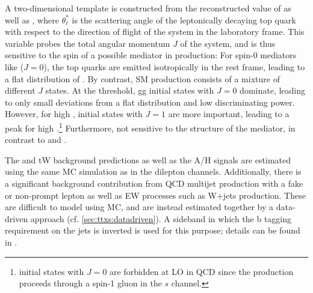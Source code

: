 A two-dimensional template is constructed from the reconstructed value of \mtt as well as \abscostl, where $\theta^*_\ell$ is the scattering angle of the leptonically decaying top quark with respect to the direction of flight of the \ttbar system in the laboratory frame. This variable probes the total angular momentum $J$ of the \ttbar system, and is thus sensitive to the spin of a possible mediator in \ttbar production: 
For spin-0 mediators like \AH ($J=0$), the top quarks are emitted isotropically in the \ttbar rest frame, leading to a flat distribution of \abscostl.
By contrast, SM \ttbar production consists of a mixture of different $J$ states. At the \ttbar threshold, gg initial states with $J=0$ dominate, leading to only small deviations from a flat \abscostl distribution and low discriminating power. However, for high \mtt, \qqbar initial states with $J=1$ are more important, leading to a peak for high \abscostl.\footnote{\qqbar initial states with $J=0$ are forbidden at LO in QCD since the production proceeds through a spin-1 gluon in the $s$ channel.}
Furthermore, \abscostl not sensitive to the \CP structure of the mediator, in contrast to \chel and \chan.

The \ttbar and tW background predictions as well as the A/H signals are estimated using the same MC simulation as in the dilepton channels. Additionally, there is a significant background contribution from QCD multijet production with a fake or non-prompt lepton as well as EW processes such as W+jets production. These are difficult to model using MC, and are instead estimated together by a data-driven approach (cf. \cref{sec:ttxs:datadriven}). A sideband in which the b tagging requirement on the jets is inverted is used for this purpose; details can be found in .

